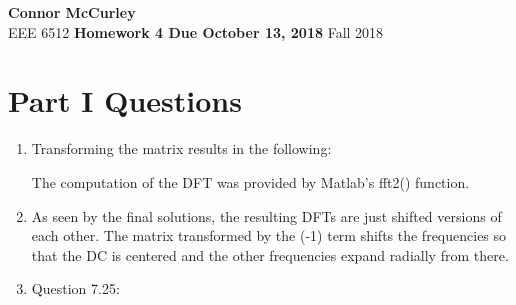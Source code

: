 \documentclass{article}[12 pt]
\begin{document}
	
\begin{center}
	\textbf{\Large Connor McCurley} \\
	EEE 6512 \qquad \textbf{\large Homework 4 Due October 13, 2018} \qquad Fall 2018 
\end{center}

\section*{Part I Questions}

\begin{enumerate}


\item Transforming the matrix results in the following:


The computation of the DFT was provided by Matlab's fft2() function.

\item As seen by the final solutions, the resulting DFTs are just shifted versions of each other.  The matrix transformed by the (-1) term shifts the frequencies so that the DC is centered and the other frequencies expand radially from there.

\item Question 7.25:


\end{enumerate}
\end{document}
